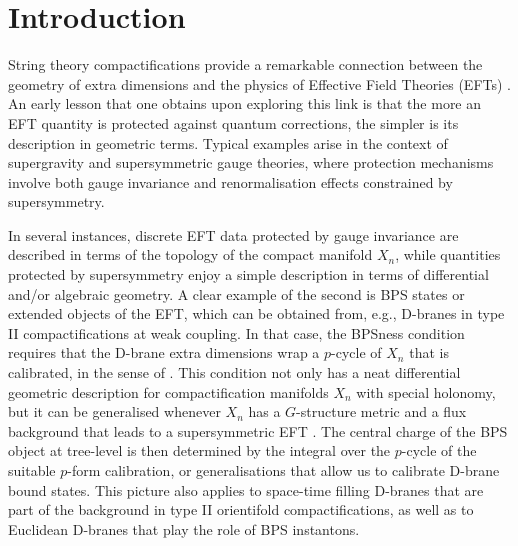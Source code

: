 \documentclass[11pt]{article}
\begin{document}

\tableofcontents


\section{Introduction}
\label{s:intro}

String theory compactifications provide a remarkable connection between the geometry of extra dimensions and the physics of Effective Field Theories (EFTs) \cite{Becker:2006dvp,Ibanez:2012zz,Blumenhagen:2013fgp,Baumann:2014nda,Tomasiello:2022dwe}. An early lesson that one obtains upon exploring this link is that the more an EFT quantity is protected against quantum corrections, the simpler is its description in geometric terms. Typical examples arise in the context of supergravity and supersymmetric gauge theories, where protection mechanisms involve both gauge invariance and renormalisation effects constrained by supersymmetry. 

In several instances, discrete EFT data protected by gauge invariance are described in terms of the topology of the compact manifold $X_n$, while quantities protected by supersymmetry enjoy a simple description in terms of differential and/or algebraic geometry. A clear example of the second is BPS states or extended objects of the EFT, which can be obtained from, e.g., D-branes in type II compactifications at weak coupling. In that case, the BPSness condition requires that the D-brane extra dimensions wrap a $p$-cycle of $X_n$ that is calibrated, in the sense of \cite{Harvey:1982xk}. This condition not only has a neat differential geometric description for compactification manifolds $X_n$ with special holonomy, but it can be generalised whenever $X_n$ has a $G$-structure metric and a flux background that leads to a supersymmetric EFT \cite{Martucci:2005ht,Koerber:2005qi,Koerber:2010bx}. The central charge of the BPS object at tree-level is then determined by the integral over the $p$-cycle of the suitable $p$-form calibration, or generalisations that allow us to calibrate D-brane bound states. This picture also applies to space-time filling D-branes that are part of the background in type II orientifold compactifications, as well as to Euclidean D-branes that play the role of BPS instantons.  
\end{document}
